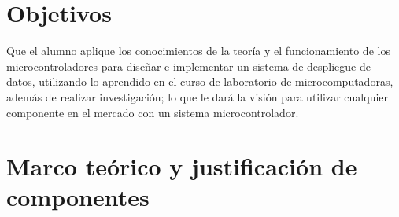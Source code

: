 \documentclass[letterpaper,12pt]{article}
\begin{document}
    

    \newpage
    \setcounter{page}{1}
    \tableofcontents
    \newpage

    \section{Objetivos}


    Que el alumno aplique los conocimientos de la teoría y el funcionamiento de los microcontroladores para
    diseñar e implementar un sistema de despliegue de datos, utilizando lo aprendido en el curso de laboratorio de
    microcomputadoras, además de realizar investigación; lo que le dará la visión para utilizar cualquier
    componente en el mercado con un sistema microcontrolador.
    \section{Marco teórico y justificación de componentes}
\end{document}
